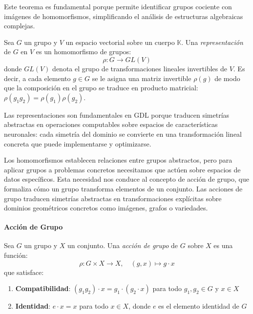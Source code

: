 Este teorema es fundamental porque permite identificar grupos cociente con imágenes de homomorfismos, simplificando el análisis de estructuras algebraicas complejas.

\begin{definition}\label{def:representacion_grupo}
Sea $G$ un grupo y $V$ un espacio vectorial sobre un cuerpo $\mathbb{K}$. Una \textit{representación} de $G$ en $V$ es un homomorfismo de grupos:
\begin{equation}
\rho: G \rightarrow GL(V)
\end{equation}
donde $GL(V)$ denota el grupo de transformaciones lineales invertibles de $V$. Es decir, a cada elemento $g \in G$ se le asigna una matriz invertible $\rho(g)$ de modo que la composición en el grupo se traduce en producto matricial: $\rho(g_1 g_2) = \rho(g_1)\rho(g_2)$.
\end{definition}

Las representaciones son fundamentales en \gls{GDL} porque traducen simetrías abstractas en operaciones computables sobre espacios de características neuronales: cada simetría del dominio se convierte en una transformación lineal concreta que puede implementarse y optimizarse.

Los homomorfismos establecen relaciones entre grupos abstractos, pero para aplicar grupos a problemas concretos necesitamos que actúen sobre espacios de datos específicos. Esta necesidad nos conduce al concepto de acción de grupo, que formaliza cómo un grupo transforma elementos de un conjunto. Las acciones de grupo traducen simetrías abstractas en transformaciones explícitas sobre dominios geométricos concretos como imágenes, grafos o variedades.

\paragraph{Acción de Grupo}

\begin{definition}\label{def:accion_grupo}
Sea $G$ un grupo y $X$ un conjunto. Una \textit{acción de grupo} de $G$ sobre $X$ es una función:
\begin{equation}
\rho: G \times X \rightarrow X, \quad (g, x) \mapsto g \cdot x
\end{equation}
que satisface:
\begin{enumerate}
    \item \textbf{Compatibilidad}: $(g_1 g_2) \cdot x = g_1 \cdot (g_2 \cdot x)$ para todo $g_1, g_2 \in G$ y $x \in X$
    \item \textbf{Identidad}: $e \cdot x = x$ para todo $x \in X$, donde $e$ es el elemento identidad de $G$
\end{enumerate}
\end{definition}


